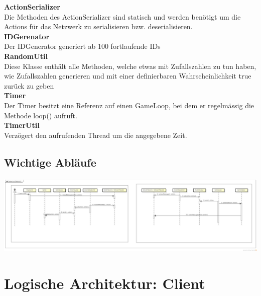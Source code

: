 \documentclass[11pt]{scrartcl}
\begin{document}
\textbf{ActionSerializer}\\
Die Methoden des ActionSerializer sind statisch und werden benötigt um die
 Actions für das Netzwerk zu
 serialisieren bzw. deserialisieren.\\
 
\textbf{IDGerenator}\\
 Der IDGenerator generiert ab 100 fortlaufende IDs\\
 
\textbf{RandomUtil}\\
Diese Klasse enthält alle Methoden, welche etwas mit Zufallszahlen zu tun haben, wie Zufallszahlen generieren und mit einer definierbaren Wahrscheinlichkeit true zurück zu geben\\

\textbf{Timer}\\
Der Timer besitzt eine Referenz auf einen GameLoop, bei dem er regelmässig die Methode loop() aufruft.\\

\textbf{TimerUtil}\\
Verzögert den aufrufenden Thread um die angegebene Zeit.\\

\begin{landscape}
  \subsection{Wichtige Abläufe}
\includegraphics[scale=0.25]{SequenceDiagramAction}
\end{landscape}
\newpage
\section{Logische Architektur: Client}
\end{document}
